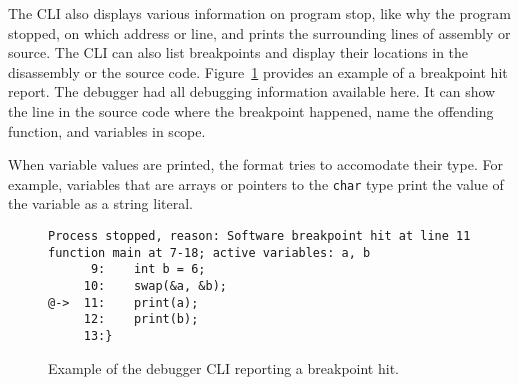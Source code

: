 The CLI also displays various information on program stop, like why the program
stopped, on which address or line, and prints the surrounding lines of assembly
or source. The CLI can also list breakpoints and display their locations in the
disassembly or the source code. Figure~\ref{fig:cli-hit} provides an example of
a breakpoint hit report. The debugger had all debugging information available
here. It can show the line in the source code where the breakpoint happened,
name the offending function, and variables in scope.

When variable values are printed, the format tries to accomodate their type.
For example, variables that are arrays or pointers to the \texttt{char} type
print the value of the variable as a string literal.

\begin{figure}
    \begin{lstlisting}
Process stopped, reason: Software breakpoint hit at line 11
function main at 7-18; active variables: a, b
      9:    int b = 6;
     10:    swap(&a, &b);
@->  11:    print(a);
     12:    print(b);
     13:}
    \end{lstlisting}
    \caption{Example of the debugger CLI reporting a breakpoint hit.}
    \label{fig:cli-hit}
\end{figure}
